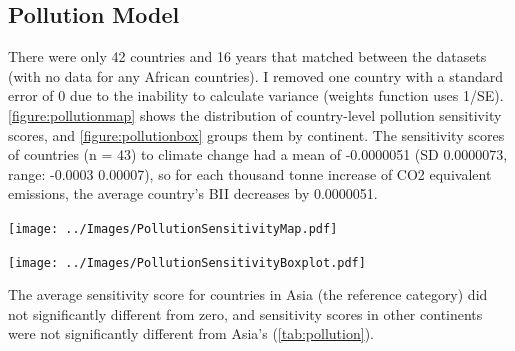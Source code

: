 \documentclass[11pt, a4paper, titlepage]{article}
\begin{document}
	\newpage
	
	\subsection*{Pollution Model}
	
	There were only 42 countries and 16 years that matched between the datasets (with no data for any African countries). I removed one country with a standard error of 0 due to the inability to calculate variance (weights function uses 1/SE). \autoref{figure:pollutionmap} shows the distribution of country-level pollution sensitivity scores, and \autoref{figure:pollutionbox} groups them by continent. The sensitivity scores of countries (n = 43) to climate change had a mean of -0.0000051 (SD 0.0000073, range: -0.0003  0.00007), so for each thousand tonne increase of CO2 equivalent emissions, the average country's BII decreases by 0.0000051.\newline
	\begin{center}
		\texttt{[image: ../Images/PollutionSensitivityMap.pdf]}
		\label{figure:pollutionmap}
		
		\texttt{[image: ../Images/PollutionSensitivityBoxplot.pdf]}
		\label{figure:pollutionbox}
	\end{center}
	The average sensitivity score for countries in Asia (the reference category) did not significantly different from zero, and sensitivity scores in other continents were not significantly different from Asia's (\autoref{tab:pollution}).
	
\end{document}
